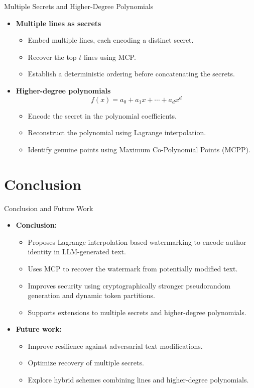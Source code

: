 \documentclass[xcolor=dvipsnames,aspectratio=169]{beamer}
\begin{document}
	\begin{frame}{Multiple Secrets and Higher-Degree Polynomials}
		\begin{itemize}
			\item \textbf{Multiple lines as secrets}
			\begin{itemize}
				\item Embed multiple lines, each encoding a distinct
				secret.
				\item Recover the top $t$ lines using MCP.
				\item Establish a deterministic ordering before
				concatenating the secrets.
			\end{itemize}
			
			\item \textbf{Higher-degree polynomials}
			\[
			f(x)=a_0+a_1x+\cdots+a_dx^d
			\]
			\begin{itemize}
				\item Encode the secret in the polynomial coefficients.
				\item Reconstruct the polynomial using Lagrange
				interpolation.
				\item Identify genuine points using Maximum
				Co-Polynomial Points (MCPP).
			\end{itemize}
		\end{itemize}
	\end{frame}
	
	\section{Conclusion}
	\begin{frame}{Conclusion and Future Work}
		\begin{itemize}
			\item \textbf{Conclusion:}
			\begin{itemize}
				\item Proposes Lagrange interpolation-based watermarking to encode author identity in LLM-generated text.
				\item Uses MCP to recover the watermark from potentially modified text.
				\item Improves security using cryptographically stronger pseudorandom generation and dynamic token partitions.
				\item Supports extensions to multiple secrets and higher-degree polynomials.
			\end{itemize}
			\item \textbf{Future work:}
			\begin{itemize}
				\item Improve resilience against adversarial text modifications.
				\item Optimize recovery of multiple secrets.
				\item Explore hybrid schemes combining lines and higher-degree polynomials.
			\end{itemize}
		\end{itemize}
	\end{frame}
	
\end{document}
